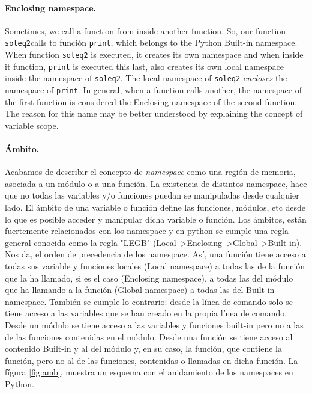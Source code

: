 \begin{paracol}{2}
\paragraph{Enclosing namespace.} Sometimes, we call a function from inside another function. So, our function \texttt{soleq2}calls to función \texttt{print}, which belongs to the Python Built-in namespace. When function \texttt{soleq2} is executed, it creates its own namespace and when inside it function, \texttt{print} is executed this last, also creates its own local namespace inside the namespace of \texttt{soleq2}. The local namespace of \texttt{soleq2} \emph{encloses} the namespace of \texttt{print}. 
In general, when a function calls another, the namespace of the first function is considered the Enclosing namespace of the second function. The reason for this name may be better understood by explaining the concept of variable scope.

\switchcolumn
\paragraph{Ámbito.} Acabamos de describir el concepto de \emph{namespace} como una región de memoria, asociada a un módulo o a una función. La existencia de distintos namespace, hace que no todas las variables y/o funciones puedan se manipuladas desde cualquier lado. El ámbito de una variable o función define las funciones, módulos, etc desde lo que es posible acceder y manipular dicha variable o función. Los ámbitos, están fuertemente relacionados con los namespace y en python se cumple una regla general conocida como la regla "LEGB" (Local--\textgreater Enclosing--\textgreater Global--\textgreater Built-in). Nos da, el orden de precedencia de los namespace. Así, una función tiene acceso a todas sus variable y funciones locales (Local namespace) a todas las de la función que la ha llamado, si es el caso (Enclosing namespace), a todas las del módulo que ha llamando a la función (Global namespace) a todas las del Built-in namespace. También se cumple lo contrario: desde la línea de comando solo se tiene acceso a las variables que se han creado en la propia línea de comando. Desde un módulo se tiene acceso a las variables y funciones built-in pero no a las de las funciones contenidas en el módulo.
Desde una función se tiene acceso al contenido Built-in y al del módulo y, en su caso, la función, que contiene la función, pero no al de las funciones, contenidas o llamadas en dicha función.
La fígura \ref{fig:amb}, muestra un esquema con el anidamiento de los namespaces en Python.
\switchcolumn

\end{paracol}
